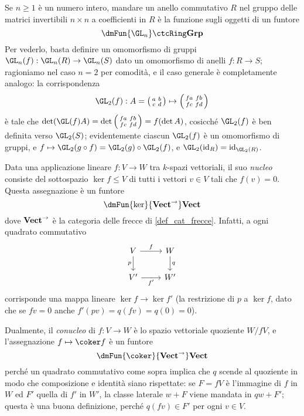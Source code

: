 \begin{example}
	Se $n\ge 1$ è un numero intero, mandare un anello commutativo $R$ nel gruppo delle matrici invertibili $n\times n$ a coefficienti in $R$ è la funzione sugli oggetti di un funtore
	\[\dmFun{\GL_n}\ctcRing\ctGrp\]
	Per vederlo, basta definire un omomorfismo di gruppi $\GL_n(f) : \GL_n(R)\to \GL_n(S)$ dato un omomorfismo di anelli $f : R\to S$; ragioniamo nel caso $n=2$ per comodità, e il caso generale è completamente analogo: la corrispondenza
	\[\GL_2(f) : A=\left(\begin{smallmatrix}
		a	&	b \\
		c	&	d
		\end{smallmatrix}\right)
		\mapsto
		\left(\begin{smallmatrix}
			fa	&	fb \\
			fc	&	fd
			\end{smallmatrix}\right)
			\]
			è tale che $\det(\GL(f)A)=\det\left(\begin{smallmatrix}
				fa	&	fb \\
				fc	&	fd
				\end{smallmatrix}\right) = f(\det A)$, cosicché $\GL_2(f)$ è ben definita verso $\GL_2(S)$; evidentemente ciascun $\GL_2(f)$ è un omomorfismo di gruppi, e $f\mapsto\GL_2(g\circ f) = \GL_2(g)\circ\GL_2(f)$, e $\GL_2(\id_R) = \id_{\GL_2(R)}$.
\end{example}
\begin{example}
	Data una applicazione lineare $f : V\to W$ tra $k$-spazi vettoriali, il suo \emph{nucleo} consiste del sottospazio $\ker f\le V$ di tutti i vettori $v\in V$ tali che $f(v)=0$. Questa assegnazione è un funtore
	\[\dmFun{\ker}{\ctVect^\to}\ctVect\]
	dove $\mathbf{Vect}^\to$ è la categoria delle frecce di \ref{def_cat_frecce}. Infatti, a ogni quadrato commutativo
	\[\begin{tikzcd}
		V \ar[r, "f"]\ar[d, "p"']& W\ar[d, "q"] \\
		V' \ar[r, "{f'}"'] & W'
	\end{tikzcd}\]
	corrisponde una mappa lineare $\ker f \to \ker f'$ (la restrizione di $p$ a $\ker f$, dato che se $fv=0$ anche $f'(pv)=q(fv)=q(0)=0$).

	Dualmente, il \emph{conucleo} di $f : V\to W$ è lo spazio vettoriale quoziente $W/fV$, e l'assegnazione $f\mapsto \coker f$ è un funtore
	\[\dmFun{\coker}{\ctVect^\to}\ctVect\]
	perché un quadrato commutativo come sopra implica che $q$ scende al quoziente in modo che composizione e identità siano rispettate: se $F = fV$ è l'immagine di $f$ in $W$ ed $F'$ quella di $f'$ in $W'$, la classe laterale $w + F$ viene mandata in $qw+F'$; questa è una buona definizione, perché $q(fv) \in F'$ per ogni $v\in V$.
\end{example}

